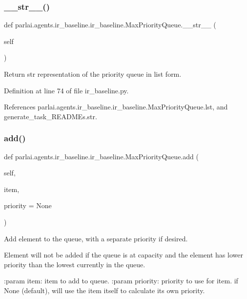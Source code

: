 \subsubsection{\texorpdfstring{\+\_\+\+\_\+str\+\_\+\+\_\+()}{\_\_str\_\_()}}
{\footnotesize\ttfamily def parlai.\+agents.\+ir\+\_\+baseline.\+ir\+\_\+baseline.\+Max\+Priority\+Queue.\+\_\+\+\_\+str\+\_\+\+\_\+ (\begin{DoxyParamCaption}\item[{}]{self }\end{DoxyParamCaption})}

\begin{DoxyVerb}Return str representation of the priority queue in list form.\end{DoxyVerb}
 

Definition at line 74 of file ir\+\_\+baseline.\+py.



References parlai.\+agents.\+ir\+\_\+baseline.\+ir\+\_\+baseline.\+Max\+Priority\+Queue.\+lst, and generate\+\_\+task\+\_\+\+R\+E\+A\+D\+M\+Es.\+str.

\mbox{\label{classparlai_1_1agents_1_1ir__baseline_1_1ir__baseline_1_1MaxPriorityQueue_ad55d735d26bc038f7a552b1789036033}} 
\subsubsection{\texorpdfstring{add()}{add()}}
{\footnotesize\ttfamily def parlai.\+agents.\+ir\+\_\+baseline.\+ir\+\_\+baseline.\+Max\+Priority\+Queue.\+add (\begin{DoxyParamCaption}\item[{}]{self,  }\item[{}]{item,  }\item[{}]{priority = {\ttfamily None} }\end{DoxyParamCaption})}

\begin{DoxyVerb}Add element to the queue, with a separate priority if desired.

Element will not be added if the queue is at capacity and the element
has lower priority than the lowest currently in the queue.

:param item: item to add to queue.
:param priority: priority to use for item. if None (default), will use
         the item itself to calculate its own priority.
\end{DoxyVerb}
 

